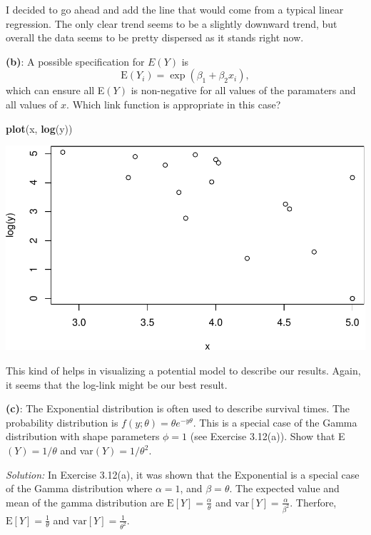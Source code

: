 \documentclass[]{article}
\newenvironment{Shaded}{\begin{snugshade}}{\end{snugshade}}
\newcommand{\KeywordTok}[1]{\textcolor[rgb]{0.13,0.29,0.53}{\textbf{{#1}}}}
\newcommand{\NormalTok}[1]{{#1}}
\begin{document}
I decided to go ahead and add the line that would come from a typical
linear regression. The only clear trend seems to be a slightly downward
trend, but overall the data seems to be pretty dispersed as it stands
right now.

\textbf{(b)}: A possible specification for \(E(Y)\) is \[
\text{E}(Y_i) = \exp(\beta_1 + \beta_2x_i),
\] which can ensure all E\((Y)\) is non-negative for all values of the
paramaters and all values of \(x\). Which link function is appropriate
in this case?

\begin{Shaded}
\begin{Highlighting}[]
\KeywordTok{plot}\NormalTok{(x, }\KeywordTok{log}\NormalTok{(y))}
\end{Highlighting}
\end{Shaded}

\includegraphics{ExercisesWithSolutions_files/figure-latex/unnamed-chunk-6-1.pdf}

This kind of helps in visualizing a potential model to describe our
results. Again, it seems that the log-link might be our best result.

\textbf{(c)}: The Exponential distribution is often used to describe
survival times. The probability distribution is
\(f(y; \theta) = \theta e^{-y\theta}\). This is a special case of the
Gamma distribution with shape parameters \(\phi = 1\) (see Exercise
3.12(a)). Show that E\((Y) = 1/\theta\) and var\((Y) = 1/\theta^2\).

\emph{Solution: } In Exercise 3.12(a), it was shown that the Exponential
is a special case of the Gamma distribution where \(\alpha = 1\), and
\(\beta = \theta\). The expected value and mean of the gamma
distribution are \(\text{E}[Y] = \frac{\alpha}{\theta}\) and
\(\text{var}[Y] = \frac{\alpha}{\beta^2}\). Therfore,
\(\text{E}[Y] = \frac{1}{\theta}\) and
\(\text{var}[Y] = \frac{1}{\theta^2}\).
\end{document}
